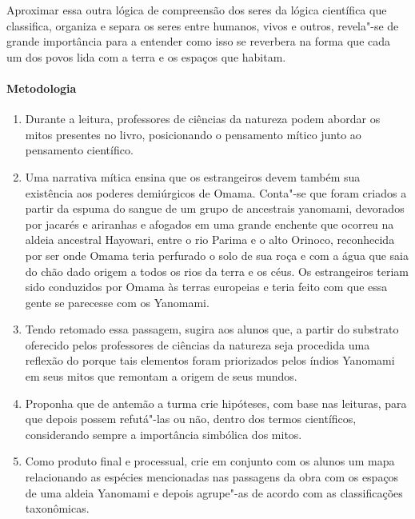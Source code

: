 \documentclass[12pt]{extarticle}
\begin{document}
Aproximar essa outra lógica de compreensão dos seres da lógica científica que classifica,
organiza e separa os seres entre humanos, vivos e outros, revela"-se de grande importância
para a entender como isso se reverbera na forma que cada um dos povos lida com a terra e os 
espaços que habitam. 

\paragraph{Metodologia}

\begin{enumerate}
\item Durante a leitura, professores de ciências da natureza podem abordar os mitos 
presentes no livro, posicionando o pensamento mítico junto ao pensamento científico.

\item Uma narrativa mítica ensina que os estrangeiros devem também sua
existência aos poderes demiúrgicos de Omama. Conta"-se que foram criados
a partir da espuma do sangue de um grupo de ancestrais yanomami, devorados por jacarés 
e ariranhas e afogados em uma grande enchente que ocorreu na aldeia ancestral Hayowari, entre 
o rio Parima e o alto Orinoco, reconhecida por ser onde Omama teria perfurado o solo de sua 
roça e com a água que saia do chão dado origem a todos os rios da terra e os céus. Os estrangeiros 
teriam sido conduzidos por Omama às terras europeias e teria feito com que essa gente se parecesse
com os Yanomami.

\item Tendo retomado essa passagem, sugira aos alunos que, a partir do
substrato oferecido pelos professores de ciências da natureza seja
procedida uma reflexão do porque tais elementos foram priorizados pelos
índios Yanomami em seus mitos que remontam a origem de seus mundos.

\item Proponha que de antemão a turma crie hipóteses, com base nas leituras, para que 
depois possem refutá"-las ou não, dentro dos termos científicos, considerando
sempre a importância simbólica dos mitos. 

\item Como produto final e processual, crie em conjunto com os alunos um mapa relacionando as 
espécies mencionadas nas passagens da obra com os espaços de uma aldeia Yanomami e depois agrupe"-as 
de acordo com as classificações taxonômicas.
\end{enumerate}
\end{document}
